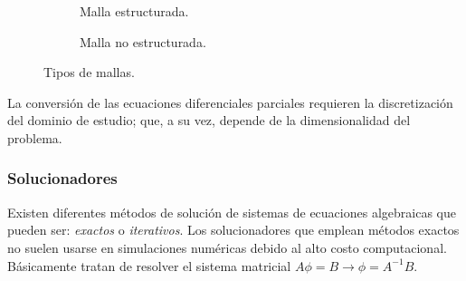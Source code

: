 \begin{figure}[h!]
	\centering
	\begin{subfigure}[b]{0.48\textwidth}
		\centering
		\begin{adjustbox}{max width = \textwidth}
		\end{adjustbox}
		\caption{Malla estructurada.}
	\end{subfigure}
	\hfill
	\begin{subfigure}[b]{0.5\textwidth}
		\centering
		\begin{adjustbox}{max width = \textwidth}
		\end{adjustbox}
	\caption{Malla no estructurada.}
	\end{subfigure}
	\caption{Tipos de mallas.}
	\label{mallas}
\end{figure}

\noindent
\justify

La conversi\'on de las ecuaciones diferenciales parciales requieren la discretizaci\'on del dominio de estudio; que, a su vez, depende de la dimensionalidad del problema.

\subsubsection{Solucionadores}

\noindent
\justify

Existen diferentes m\'etodos de soluci\'on de sistemas de ecuaciones algebraicas que pueden ser: \textit{exactos} o \textit{iterativos}. Los solucionadores que emplean m\'etodos exactos no suelen usarse en simulaciones num\'ericas debido al alto costo computacional. B\'asicamente tratan de resolver el sistema matricial $A \phi = B \rightarrow \phi = A^{-1} B$. 

